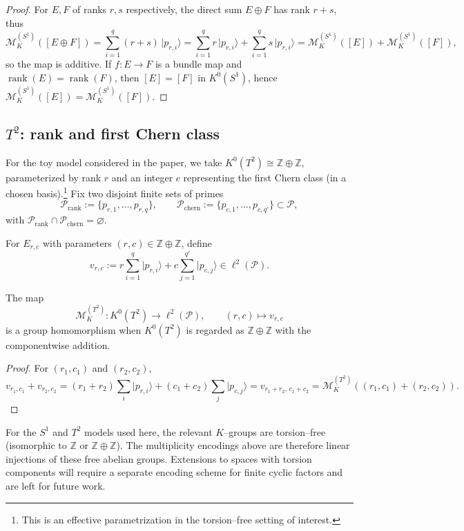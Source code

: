 \documentclass[11pt]{article}
\begin{document}
\begin{proof}
For $E,F$ of ranks $r,s$ respectively, the direct sum $E\oplus F$ has rank $r+s$, thus
\[
\mathcal{M}_K^{(S^1)}([E\oplus F])
  = \sum_{i=1}^q (r+s)\, \lvert p_{r,i}\rangle
  = \sum_{i=1}^q r\,\lvert p_{r,i}\rangle + \sum_{i=1}^q s\,\lvert p_{r,i}\rangle
  = \mathcal{M}_K^{(S^1)}([E]) + \mathcal{M}_K^{(S^1)}([F]),
\]
so the map is additive.
If $f:E\to F$ is a bundle map and $\operatorname{rank}(E)=\operatorname{rank}(F)$, then $[E]=[F]$ in $K^0(S^1)$, hence $\mathcal{M}_K^{(S^1)}([E])=\mathcal{M}_K^{(S^1)}([F])$.
\end{proof}

\subsection{$T^2$: rank and first Chern class}

For the toy model considered in the paper, we take $K^0(T^2)\cong \mathbb{Z}\oplus\mathbb{Z}$, parameterized by rank $r$ and an integer $c$ representing the first Chern class (in a chosen basis).\footnote{This is an effective parametrization in the torsion–free setting of interest.}
Fix two disjoint finite sets of primes
\[
\mathcal{P}_{\mathrm{rank}} := \{p_{r,1},\dots,p_{r,q}\},\qquad
\mathcal{P}_{\mathrm{chern}} := \{p_{c,1},\dots,p_{c,q'}\}\subset\mathcal{P},
\]
with $\mathcal{P}_{\mathrm{rank}}\cap\mathcal{P}_{\mathrm{chern}}=\varnothing$.

For $E_{r,c}$ with parameters $(r,c)\in\mathbb{Z}\oplus \mathbb{Z}$, define
\[
v_{r,c}
  := r \sum_{i=1}^q \lvert p_{r,i}\rangle
   + c \sum_{j=1}^{q'} \lvert p_{c,j}\rangle \in \ell^2(\mathcal{P}).
\]

\begin{proposition}
The map
\[
\mathcal{M}_K^{(T^2)}: K^0(T^2)\to \ell^2(\mathcal{P}),\qquad
(r,c)\mapsto v_{r,c}
\]
is a group homomorphism when $K^0(T^2)$ is regarded as $\mathbb{Z}\oplus\mathbb{Z}$ with the componentwise addition.
\end{proposition}

\begin{proof}
For $(r_1,c_1)$ and $(r_2,c_2)$,
\[
v_{r_1,c_1} + v_{r_2,c_2}
 = (r_1+r_2) \sum_i \lvert p_{r,i}\rangle
 + (c_1+c_2) \sum_j \lvert p_{c,j}\rangle
 = v_{r_1+r_2,\,c_1+c_2} = \mathcal{M}_K^{(T^2)}((r_1,c_1)+(r_2,c_2)).
\]
\end{proof}

\begin{remark}
For the $S^1$ and $T^2$ models used here, the relevant $K$--groups are torsion–free (isomorphic to $\mathbb{Z}$ or $\mathbb{Z}\oplus\mathbb{Z}$).
The multiplicity encodings above are therefore linear injections of these free abelian groups.
Extensions to spaces with torsion components will require a separate encoding scheme for finite cyclic factors and are left for future work.
\end{remark}
\end{document}
